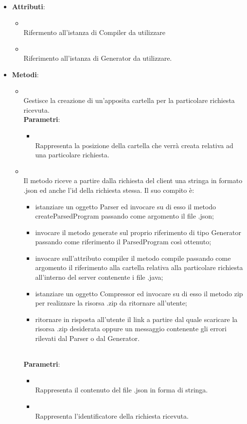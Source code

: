 \begin{itemize}
\item \textbf{Attributi}:
\begin{itemize}
\item {}
\\ Rifermento all'istanza di Compiler da utilizzare
\item {}
\\ Riferimento all'istanza di Generator da utilizzare.
\end{itemize}
\item \textbf{Metodi}:
\begin{itemize}
\item {}
\\ Gestisce la creazione di un'apposita cartella per la particolare richiesta ricevuta.
\\ \textbf{Parametri}:
\begin{itemize}
\item {}
\\ Rappresenta la posizione della cartella che verrà creata relativa ad una particolare richiesta.
\end{itemize}
\item {}
\\ Il metodo riceve a partire dalla richiesta del client una stringa in formato .json ed anche l'id della richiesta stessa.
Il suo compito è:
\begin{itemize}
\item istanziare un oggetto Parser ed invocare su di esso il metodo createParsedProgram passando come argomento il file .json;
\item invocare il metodo generate sul proprio riferimento di tipo Generator passando come riferimento il ParsedProgram così ottenuto;
\item invocare sull'attributo compiler il metodo compile passando come argomento il riferimento alla cartella relativa alla particolare richiesta all'interno del server contenente i file .java;
\item istanziare un oggetto Compressor ed invocare su di esso il metodo zip per realizzare la risorsa .zip da ritornare all'utente;
\item ritornare in risposta all'utente il link a partire dal quale scaricare la risorsa .zip desiderata oppure un messaggio contenente gli errori rilevati dal Parser o dal Generator.
\end{itemize}
\\ \textbf{Parametri}:
\begin{itemize}
\item {}
\\ Rappresenta il contenuto del file .json in forma di stringa.
\item {}
\\ Rappresenta l'identificatore della richiesta ricevuta.
\end{itemize}
\end{itemize}
\end{itemize}
